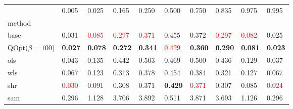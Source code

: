 \begin{tabular}{llllllllll}
\toprule
 & 0.005 & 0.025 & 0.165 & 0.250 & 0.500 & 0.750 & 0.835 & 0.975 & 0.995 \\
method &  &  &  &  &  &  &  &  &  \\
\midrule
base & 0.031 & \textcolor{red}{0.085} & \textcolor{red}{0.297} & \textcolor{red}{0.371} & 0.455 & 0.372 & \textcolor{red}{0.297} & \textcolor{red}{0.082} & 0.025 \\
\midrule
QOpt($\beta=100$) & \textbf{0.027} & \textbf{0.078} & \textbf{0.272} & \textbf{0.341} & \textcolor{red}{0.429} & \textbf{0.360} & \textbf{0.290} & \textbf{0.081} & \textbf{0.023} \\
ols & 0.043 & 0.135 & 0.442 & 0.503 & 0.469 & 0.500 & 0.436 & 0.129 & 0.037 \\
wls & 0.067 & 0.123 & 0.313 & 0.378 & 0.454 & 0.384 & 0.321 & 0.127 & 0.067 \\
shr & \textcolor{red}{0.030} & 0.091 & 0.308 & 0.371 & \textbf{0.429} & \textcolor{red}{0.371} & 0.307 & 0.085 & \textcolor{red}{0.024} \\
sam & 0.296 & 1.128 & 3.706 & 3.892 & 0.511 & 3.871 & 3.693 & 1.126 & 0.296 \\
\bottomrule
\end{tabular}